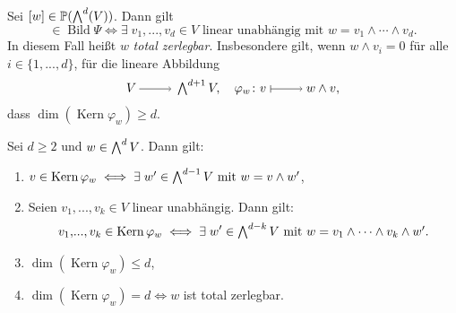 \documentclass[a4paper,12pt,index=toc]{scrbook}
\theoremstyle{keinenummern} %
\def\P{\mathbb{P}}
\newcommand{\Kern}{\operatorname{Kern}}
\newcommand{\Bild}{\operatorname{Bild}}
\renewcommand{\dotsc}{\ensuremath{\!...}}
\let\grassmann\bigwedge
\def\bigwedge{\begingroup\textstyle\grassmann\endgroup}
\begin{document}
\begin{db}\label{2.7.2}
Sei $[w]\in\P(\bigwedge^{d}(V))$. Dann gilt
\begin{equation*}[w]\in\Bild\Psi\iff\exists\; v_{1},\dotsc,v_{d}\in V\text{ linear unabhängig mit }w=v_{1}\wedge\dotsm\wedge v_{d}.\end{equation*}
In diesem Fall heißt $w$ \emph{total zerlegbar}. Insbesondere gilt, wenn $w\wedge v_{i}=0$ für alle $i\in\{1,\dotsc,d\}$, für die lineare Abbildung
\begin{equation*}V\ra\bigwedge^{d+1}V,\quad \varphi_{w}\colon v\mapsto w\wedge v,\end{equation*}
dass $\dim(\Kern\varphi_{w})\geq d$.
\end{db}

\begin{lem}\label{2.7.3}
Sei $d\geq 2$ und $w\in\bigwedge^{d}V$. Dann gilt:
\begin{enumerate}
\item{} $v\in\Kern\varphi_{w}\iff\exists\; w'\in\bigwedge^{d-1}V\text{ mit }w=v\wedge w'$,
\item{} Seien $v_{1},\dotsc,v_{k}\in V$ linear unabhängig. Dann gilt:
\begin{equation*}v_{1},\dotsc,v_{k}\in\Kern\varphi_{w}\iff\exists\; w'\in\bigwedge^{d-k}V\text{ mit }w=v_{1}\wedge\dotsm\wedge v_{k}\wedge w'.\end{equation*}
\item{} $\dim(\Kern\varphi_{w})\leq d$,
\item{} $\dim(\Kern\varphi_{w})=d\iff w$ ist total zerlegbar.
\end{enumerate}\end{lem}
\end{document}
